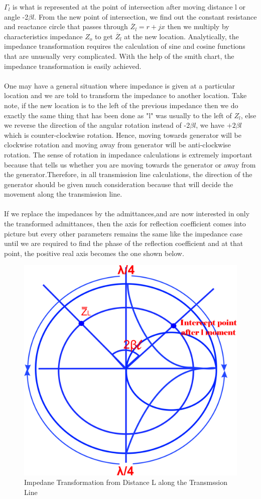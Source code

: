 $\Gamma_{l}$ is what is represented at the point of intersection after moving distance l or angle -2$\beta{l}$. From the new point of  intersection, we find out the constant resistance and reactance circle that passes through $\overline{Z}_{l} = r + jx$ then we multiply by characteristics impedance $Z_o$ to get $\overline{Z}_{l}$ at the new location. Analytically, the impedance transformation requires the calculation of sine and cosine functions that are unusually very complicated. With the help of the smith chart, the impedance transformation is easily achieved.\\\\
One may have a general situation where impedance is given at a particular location and we are told to transform the impedance to another location. Take note, if the new location is to the left of the previous impedance then we do exactly the same thing that has been done as "l" was usually to the left of $Z_{l}$, else we reverse the direction of the angular rotation instead of -2$\beta{l}$, we have $+2\beta{l}$ which is counter-clockwise rotation. Hence, moving towards generator will be clockwise rotation and moving away from generator will be anti-clockwise rotation. The sense of rotation in impedance calculations is extremely important because that tells us whether you are moving towards the generator or away from the generator.Therefore, in all transmission line calculations, the direction of the generator should be given much consideration because that will decide the movement along the transmission line. \\\\
If we replace the impedances by the admittances,and are now interested in only the transformed admittances, then the axis for reflection coefficient comes into picture but every other parameters remains the same like the impedance case until we are required to find the phase of the reflection coefficient and at that point, the positive real axis becomes the one shown below.
\begin{figure}[h]
\centering
\includegraphics[width=0.5\linewidth]{./graphics/mjhtre}
\caption{Impedane Transformation from Distance L along the Transmssion Line}
\label{fig:mjhtre}
\end{figure}

